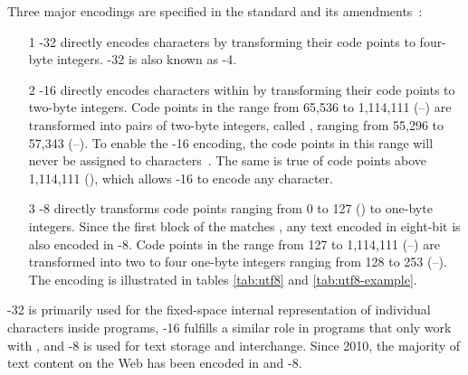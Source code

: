 Three major encodings are specified in the  standard and its
amendments~\cite{iso93:am1,iso93:am2}:
\begin{enumerate}
  \item[1]-32
    directly encodes  characters by transforming their code points
    to four-byte integers. -32 is also known as
    -4.
  \item[2]-16
    directly encodes characters within  by transforming their code
    points to two-byte integers. Code points in the range from 65,536 to
    1,114,111 (\mbox{--}) are transformed into pairs
    of two-byte integers, called , ranging from 55,296 to
    57,343 (\mbox{--}). To enable the -16
    encoding, the code points in this range will never be assigned to
    characters~\cite[sec.\,3.4, D15]{unicode16}. The same is true of code points
    above 1,114,111 (), which allows -16 to encode
    any  character.
  \item[3]-8
    directly transforms code points ranging from 0 to 127 () to
    one-byte integers. Since the first  block of the
     matches , any text encoded in eight-bit
     is also encoded in -8. Code points in the
    range from 127 to 1,114,111 (\mbox{--}) are
    transformed into two to four one-byte integers ranging from 128 to 253
    (\mbox{--}). The encoding is illustrated in tables
    \ref{tab:utf8} and \ref{tab:utf8-example}.
\end{enumerate}

-32 is primarily used for the fixed-space internal representation
of individual  characters inside programs, -16
fulfills a similar role in programs that only work with , and
-8 is used for text storage and interchange. Since 2010, the
majority of text content on the Web has been encoded in  and
-8.~\cite{qsuccess15}

